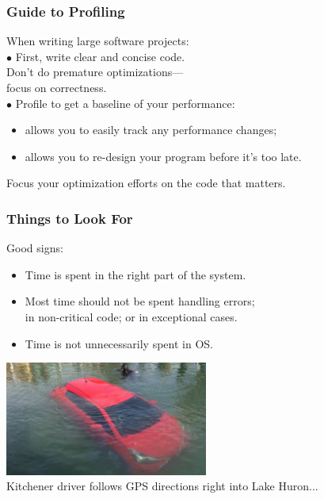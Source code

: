 \begin{frame}
  \frametitle{Guide to Profiling}

  

\begin{changemargin}{1cm}
  When writing large software projects:\\[1em]

     $\bullet$ First, write clear and concise code. \\
      \qquad Don't do premature optimizations---\\
      \qquad focus on correctness.\\
     $\bullet$ Profile to get a baseline of your performance:\\[0em]
      \begin{itemize}
        \item allows you to easily track any performance changes;
        \item allows you to re-design your program before it's too late.
      \end{itemize}
  Focus your optimization efforts on the code that matters.
  \end{changemargin}
\end{frame}

\begin{frame}
  \frametitle{Things to Look For}


\begin{changemargin}{1.5cm}
  
    Good signs:\\[0em]

    \begin{itemize}
      \item Time is spent in the right part of the system.
      \item Most time should not be spent handling errors;\\
 in non-critical code; or in exceptional cases.
      \item Time is not unnecessarily spent in OS.
    \end{itemize}
    \end{changemargin}
    
    \begin{center}
	\includegraphics[width=0.5\textwidth]{images/tobermory.jpg}\\
	\hfill Kitchener driver follows GPS directions right into Lake Huron...
 	\end{center}
    
\end{frame}

